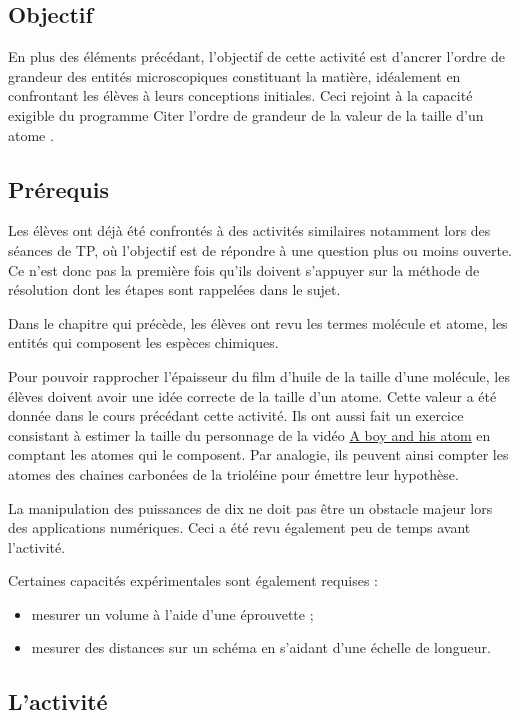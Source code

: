 \documentclass[12pt,a4paper]{article}
\begin{document}
\subsection{Objectif}

En plus des éléments précédant, l'objectif de cette activité est d'ancrer l'ordre de grandeur des entités microscopiques constituant la matière, idéalement en confrontant les élèves à leurs conceptions initiales.
Ceci rejoint à la capacité exigible du programme \og Citer l'ordre de grandeur de la valeur de la taille d'un atome \fg{}. 

\subsection{Prérequis}

Les élèves ont déjà été confrontés à des activités similaires notamment lors des séances de TP, où l'objectif est de répondre à une question plus ou moins ouverte.
Ce n'est donc pas la première fois qu'ils doivent s'appuyer sur la méthode de résolution dont les étapes sont rappelées dans le sujet.

Dans le chapitre qui précède, les élèves ont revu les termes molécule et atome, les entités qui composent les espèces chimiques.

Pour pouvoir rapprocher l'épaisseur du film d'huile de la taille d'une molécule, les élèves doivent avoir une idée correcte de la taille d'un atome.
Cette valeur a été donnée dans le cours précédant cette activité.
Ils ont aussi fait un exercice consistant à estimer la taille du personnage de la vidéo \href{https://youtu.be/oSCX78-8-q0}{A boy and his atom} en comptant les \og atomes \fg{} qui le composent.
Par analogie, ils peuvent ainsi compter les atomes des chaines carbonées de la trioléine pour émettre leur hypothèse.

La manipulation des puissances de dix ne doit pas être un obstacle majeur lors des applications numériques.
Ceci a été revu également peu de temps avant l'activité.

Certaines capacités expérimentales sont également requises :
\begin{itemize}
\item mesurer un volume à l'aide d'une éprouvette ;
\item mesurer des distances sur un schéma en s'aidant d'une échelle de longueur.
\end{itemize}

\subsection{L'activité}
\end{document}
